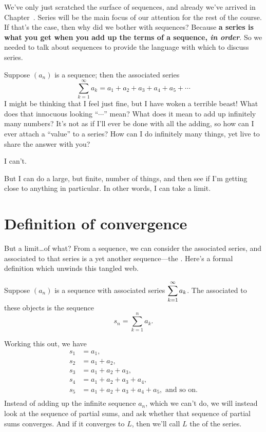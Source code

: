 \nobreak We've only just scratched the surface of sequences, and
already we've arrived in Chapter~.  Series will
be the main focus of our attention for the rest of the course.  If
that's the case, then why did we bother with sequences?  Because
\textbf{a series is what you get when you add up the terms of a
  sequence, \textit{in order}}.  So we needed to talk about sequences
to provide the language with which to discuss series.

Suppose $(a_n)$ is a sequence; then the associated series
$$\sum_{k=1}^\infty a_k=a_1+a_2+a_3+a_4+a_5+\cdots$$
I might be thinking that I feel just fine, but I have woken a terrible
beast!  What does that innocuous looking ``$\cdots$'' mean?  What does
it mean to add up infinitely many numbers?  It's not as if I'll ever
be done with all the adding, so how can I ever attach a ``value'' to a
series?  How can I do infinitely many things, yet live to share the
answer with you?

I can't.

But I can do a large, but finite, number of things, and then see if
I'm getting close to anything in particular.  In other words, I can
take a limit.

\section{Definition of convergence}
\label{section:series-definition}

But a limit\ldots of what?  From a sequence, we can consider the
associated series, and associated to that series is a yet another
sequence---the .  Here's a formal definition which unwinds this tangled web.
\begin{definition}
  Suppose $(a_n)$ is a sequence with associated series
  $\displaystyle\sum_{k=1}^\infty a_k$.  The 
  associated to these objects is the sequence
 $$
 s_n = \sum_{k=1}^n a_k.
 $$
 \end{definition}
Working this out, we have
\begin{align*}
  s_1&=a_1, \\
  s_2&=a_1+a_2,\\ 
  s_3&=a_1+a_2+a_3, \\
  s_4&=a_1+a_2+a_3+a_4, \\
  s_5&=a_1+a_2+a_3+a_4+a_5, \mbox{ and so on.}\\
\end{align*}
Instead of adding up the infinite sequence $a_n$, which we can't do,
we will instead look at the sequence of partial sums, and ask whether
that sequence of partial sums converges.  And if it converges to $L$,
then we'll call $L$ the  of the series.

